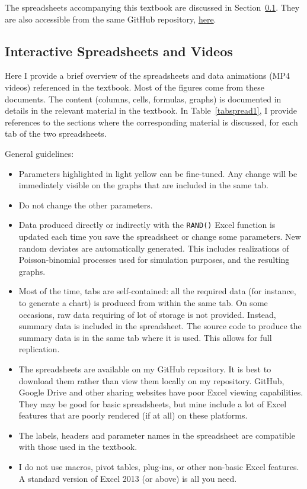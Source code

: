 \documentclass[10pt]{article}
\begin{document}
The spreadsheets accompanying this textbook are discussed in Section~\ref{spr}. They are also accessible from the same GitHub repository, 
\href{https://github.com/VincentGranville/Point-Processes/tree/main/Spreadsheets}{here}.

\subsection{Interactive Spreadsheets and Videos}\label{spr}

Here I provide a brief overview of the spreadsheets and data animations (MP4 videos) referenced in the textbook. Most of the figures come from these documents. 
The content (columns, cells, formulas, graphs) is documented in details in the relevant material in the textbook. 
In Table~\ref{tabspread1}, I provide references to the sections where the corresponding material is discussed, for each tab of the two spreadsheets. %
  
\noindent  General guidelines:
\nopagebreak \begin{itemize}
\item Parameters highlighted in light yellow can be fine-tuned. Any change will be immediately visible on the graphs that are included in the same tab.
\item Do not change the other parameters.
\item Data produced directly or indirectly with the \texttt{RAND()} Excel function is updated each time you save the spreadsheet or change some parameters. New random deviates are automatically generated. This includes realizations of Poisson-binomial processes used for simulation purposes, and the resulting graphs.
\item Most of the time, tabs are self-contained: all the required data (for instance, to generate a chart) is produced from within the same tab. On some occasions, raw data requiring of lot of storage is not provided.
Instead, summary data is included in the spreadsheet. The source code to produce the summary data  is in the same tab where it is used. This allows for full
 replication. 
\item The spreadsheets are available on my GitHub repository. It is best to download them rather than view them locally on my repository. GitHub, Google Drive and other sharing websites have poor Excel viewing capabilities. They may be good for basic spreadsheets, but mine include a lot of Excel features that are poorly rendered (if at all) on these platforms.
\item The labels, headers and parameter names in the spreadsheet are compatible with those used in the textbook. 
\item I do not use macros, pivot tables, plug-ins, or other non-basic Excel features. A standard version of Excel 2013 (or above) is all you need.
\end{itemize}
\end{document}
